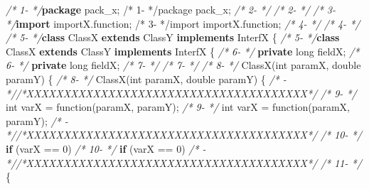 \documentclass[
]{article}
\newenvironment{Shaded}{\begin{snugshade}}{\end{snugshade}}
\newcommand{\CommentTok}[1]{\textcolor[rgb]{0.56,0.35,0.01}{\textit{#1}}}
\newcommand{\DataTypeTok}[1]{\textcolor[rgb]{0.13,0.29,0.53}{#1}}
\newcommand{\DecValTok}[1]{\textcolor[rgb]{0.00,0.00,0.81}{#1}}
\newcommand{\FunctionTok}[1]{\textcolor[rgb]{0.00,0.00,0.00}{#1}}
\newcommand{\ImportTok}[1]{#1}
\newcommand{\KeywordTok}[1]{\textcolor[rgb]{0.13,0.29,0.53}{\textbf{#1}}}
\newcommand{\NormalTok}[1]{#1}
\begin{document}
\begin{Shaded}
\begin{Highlighting}[]
\CommentTok{/*  1{-}   */}\KeywordTok{package}\ImportTok{ pack\_x;                                          /*  1{-}   */package pack\_x;}                                          
\CommentTok{/*  2{-}   */}                                                         \CommentTok{/*  2{-}   */}                                                         
\CommentTok{/*  3{-}   */}\KeywordTok{import}\ImportTok{ importX.function;                                 /*  3{-}   */import importX.function;}                                 
\CommentTok{/*  4{-}   */}                                                         \CommentTok{/*  4{-}   */}                                                         
\CommentTok{/*  5{-}   */}\KeywordTok{class}\NormalTok{ ClassX }\KeywordTok{extends}\NormalTok{ ClassY }\KeywordTok{implements}\NormalTok{ InterfX \{         }\CommentTok{/*  5{-}   */}\KeywordTok{class}\NormalTok{ ClassX }\KeywordTok{extends}\NormalTok{ ClassY }\KeywordTok{implements}\NormalTok{ InterfX \{         }
\CommentTok{/*  6{-}   */}    \KeywordTok{private} \DataTypeTok{long}\NormalTok{ fieldX;                                 }\CommentTok{/*  6{-}   */}    \KeywordTok{private} \DataTypeTok{long}\NormalTok{ fieldX;                                 }
\CommentTok{/*  7{-}   */}                                                         \CommentTok{/*  7{-}   */}                                                         
\CommentTok{/*  8{-}   */}    \FunctionTok{ClassX}\NormalTok{(}\DataTypeTok{int}\NormalTok{ paramX, }\DataTypeTok{double}\NormalTok{ paramY) \{                  }\CommentTok{/*  8{-}   */}    \FunctionTok{ClassX}\NormalTok{(}\DataTypeTok{int}\NormalTok{ paramX, }\DataTypeTok{double}\NormalTok{ paramY) \{                  }
\CommentTok{/*   {-}   *//*XXXXXXXXXXXXXXXXXXXXXXXXXXXXXXXXXXXXXX*/}               \CommentTok{/*  9{-}   */}        \DataTypeTok{int}\NormalTok{ varX = }\FunctionTok{function}\NormalTok{(paramX, paramY);                  }
\CommentTok{/*  9{-}   */}        \DataTypeTok{int}\NormalTok{ varX = }\FunctionTok{function}\NormalTok{(paramX, paramY);             }\CommentTok{/*   {-}   *//*XXXXXXXXXXXXXXXXXXXXXXXXXXXXXXXXXXXXXX*/}               
\CommentTok{/* 10{-}   */}        \KeywordTok{if}\NormalTok{ (varX == }\DecValTok{0}\NormalTok{)                                   }\CommentTok{/* 10{-}   */}        \KeywordTok{if}\NormalTok{ (varX == }\DecValTok{0}\NormalTok{)                                   }
\CommentTok{/*   {-}   *//*XXXXXXXXXXXXXXXXXXXXXXXXXXXXXXXXXXXXXX*/}               \CommentTok{/* 11{-}   */}\NormalTok{        \{                                                }

\end{Highlighting}
\end{Shaded}
\end{document}
